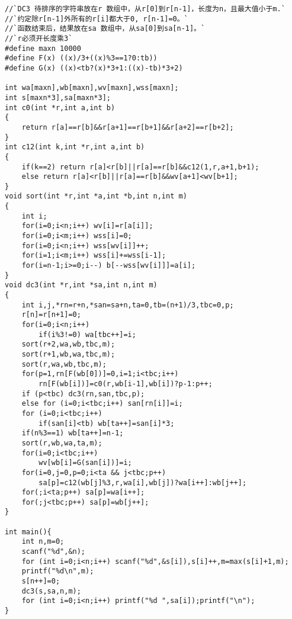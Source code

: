 \begin{lstlisting}
//`DC3 待排序的字符串放在r 数组中，从r[0]到r[n-1]，长度为n，且最大值小于m.`
//`约定除r[n-1]外所有的r[i]都大于0, r[n-1]=0。`
//`函数结束后，结果放在sa 数组中，从sa[0]到sa[n-1]。`
//`r必须开长度乘3`
#define maxn 10000
#define F(x) ((x)/3+((x)%3==1?0:tb))
#define G(x) ((x)<tb?(x)*3+1:((x)-tb)*3+2)

int wa[maxn],wb[maxn],wv[maxn],wss[maxn];
int s[maxn*3],sa[maxn*3];
int c0(int *r,int a,int b)
{
	return r[a]==r[b]&&r[a+1]==r[b+1]&&r[a+2]==r[b+2];
}
int c12(int k,int *r,int a,int b)
{
	if(k==2) return r[a]<r[b]||r[a]==r[b]&&c12(1,r,a+1,b+1);
	else return r[a]<r[b]||r[a]==r[b]&&wv[a+1]<wv[b+1];
}
void sort(int *r,int *a,int *b,int n,int m)
{
	int i;
	for(i=0;i<n;i++) wv[i]=r[a[i]];
	for(i=0;i<m;i++) wss[i]=0;
	for(i=0;i<n;i++) wss[wv[i]]++;
	for(i=1;i<m;i++) wss[i]+=wss[i-1];
	for(i=n-1;i>=0;i--) b[--wss[wv[i]]]=a[i];
}
void dc3(int *r,int *sa,int n,int m)
{
	int i,j,*rn=r+n,*san=sa+n,ta=0,tb=(n+1)/3,tbc=0,p;
	r[n]=r[n+1]=0;
	for(i=0;i<n;i++)
		if(i%3!=0) wa[tbc++]=i;
	sort(r+2,wa,wb,tbc,m);
	sort(r+1,wb,wa,tbc,m);
	sort(r,wa,wb,tbc,m);
	for(p=1,rn[F(wb[0])]=0,i=1;i<tbc;i++)
		rn[F(wb[i])]=c0(r,wb[i-1],wb[i])?p-1:p++;
	if (p<tbc) dc3(rn,san,tbc,p);
	else for (i=0;i<tbc;i++) san[rn[i]]=i;
	for (i=0;i<tbc;i++)
		if(san[i]<tb) wb[ta++]=san[i]*3;
	if(n%3==1) wb[ta++]=n-1;
	sort(r,wb,wa,ta,m);
	for(i=0;i<tbc;i++)
		wv[wb[i]=G(san[i])]=i;
	for(i=0,j=0,p=0;i<ta && j<tbc;p++)
		sa[p]=c12(wb[j]%3,r,wa[i],wb[j])?wa[i++]:wb[j++];
	for(;i<ta;p++) sa[p]=wa[i++];
	for(;j<tbc;p++) sa[p]=wb[j++];
}

int main(){
	int n,m=0;
	scanf("%d",&n);
	for (int i=0;i<n;i++) scanf("%d",&s[i]),s[i]++,m=max(s[i]+1,m);
	printf("%d\n",m);
	s[n++]=0;
	dc3(s,sa,n,m);
	for (int i=0;i<n;i++) printf("%d ",sa[i]);printf("\n");
}
	\end{lstlisting}
